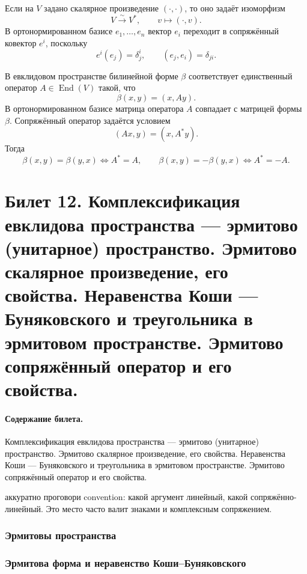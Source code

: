 \documentclass[12pt,a4paper]{article}
\theoremstyle{definition}
\theoremstyle{plain}
\theoremstyle{remark}
\newenvironment{planadd}{\begin{planbox}}{\end{planbox}}
\newcommand{\End}{\operatorname{End}}
\begin{document}
Если на $V$ задано скалярное произведение $(\cdot,\cdot)$, то оно задаёт изоморфизм
\[
    V\xrightarrow{\sim} V^*,\qquad v\mapsto (\cdot,v).
\]
В ортонормированном базисе $e_1,\ldots,e_n$ вектор $e_i$ переходит в сопряжённый ковектор $e^i$, поскольку
\[
    e^i(e_j)=\delta^i_j,
    \qquad
    (e_j,e_i)=\delta_{ji}.
\]

В евклидовом пространстве билинейной форме $\beta$ соответствует единственный оператор $A\in\End(V)$ такой, что
\[
    \beta(x,y)=(x,Ay).
\]
В ортонормированном базисе матрица оператора $A$ совпадает с матрицей формы $\beta$.
Сопряжённый оператор задаётся условием
\[
    (Ax,y)=(x,A^*y).
\]
Тогда
\[
    \beta(x,y)=\beta(y,x)\Longleftrightarrow A^*=A,
    \qquad
    \beta(x,y)=-\beta(y,x)\Longleftrightarrow A^*=-A.
\]

\clearpage

\section{Билет 12. Комплексификация евклидова пространства — эрмитово (унитарное) пространство. Эрмитово скалярное произведение, его свойства. Неравенства Коши — Буняковского и треугольника в эрмитовом пространстве. Эрмитово сопряжённый оператор и его свойства.}

\paragraph{Содержание билета.} Комплексификация евклидова пространства — эрмитово (унитарное) пространство. Эрмитово скалярное произведение, его свойства. Неравенства Коши — Буняковского и треугольника в эрмитовом пространстве. Эрмитово сопряжённый оператор и его свойства.

\begin{planadd}

аккуратно проговори convention: какой аргумент линейный, какой сопряжённо-линейный. Это место часто валит знаками и комплексным сопряжением.

\end{planadd}

\subsubsection{Эрмитовы пространства}

\subsubsection*{Эрмитова форма и неравенство Коши--Буняковского}
\end{document}
